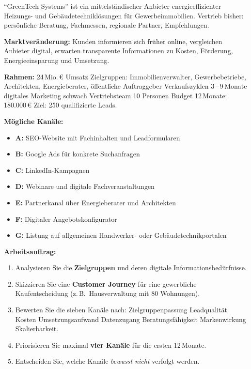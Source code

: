 \documentclass[11pt,a4paper,oneside]{article}
\begin{document}
\begin{infobox}
``GreenTech Systems'' ist ein mittelständischer Anbieter energieeffizienter Heizungs- und Gebäudetechniklösungen für Gewerbeimmobilien. Vertrieb bisher: persönliche Beratung, Fachmessen, regionale Partner, Empfehlungen.

\smallskip
\textbf{Marktveränderung:} Kunden informieren sich früher online, vergleichen Anbieter digital, erwarten transparente Informationen zu Kosten, Förderung, Energieeinsparung und Umsetzung.

\smallskip
\textbf{Rahmen:} 24\,Mio.\,\euro{} Umsatz \textperiodcentered{} Zielgruppen: Immobilienverwalter, Gewerbebetriebe, Architekten, Energieberater, öffentliche Auftraggeber \textperiodcentered{} Verkaufszyklen 3\,--\,9\,Monate \textperiodcentered{} digitales Marketing schwach \textperiodcentered{} Vertriebsteam 10 Personen \textperiodcentered{} Budget 12\,Monate: 180.000\,\euro{} \textperiodcentered{} Ziel: 250 qualifizierte Leads.

\smallskip
\textbf{Mögliche Kanäle:}
\begin{itemize}
  \item \textbf{A:} SEO-Website mit Fachinhalten und Leadformularen
  \item \textbf{B:} Google Ads für konkrete Suchanfragen
  \item \textbf{C:} LinkedIn-Kampagnen
  \item \textbf{D:} Webinare und digitale Fachveranstaltungen
  \item \textbf{E:} Partnerkanal über Energieberater und Architekten
  \item \textbf{F:} Digitaler Angebotskonfigurator
  \item \textbf{G:} Listung auf allgemeinen Handwerker- oder Gebäudetechnikportalen
\end{itemize}
\end{infobox}

\noindent\textbf{Arbeitsauftrag:}

\begin{enumerate}
  \item Analysieren Sie die \textbf{Zielgruppen} und deren digitale Informationsbedürfnisse.
  \item Skizzieren Sie eine \textbf{Customer Journey} für eine gewerbliche Kaufentscheidung (z.\,B.\ Hausverwaltung mit 80 Wohnungen).
  \item Bewerten Sie die sieben Kanäle nach: Zielgruppenpassung \textperiodcentered{} Leadqualität \textperiodcentered{} Kosten \textperiodcentered{} Umsetzungsaufwand \textperiodcentered{} Datenzugang \textperiodcentered{} Beratungsfähigkeit \textperiodcentered{} Markenwirkung \textperiodcentered{} Skalierbarkeit.
  \item Priorisieren Sie maximal \textbf{vier Kanäle} für die ersten 12\,Monate.
  \item Entscheiden Sie, welche Kanäle \emph{bewusst nicht} verfolgt werden.
\end{enumerate}
\end{document}
